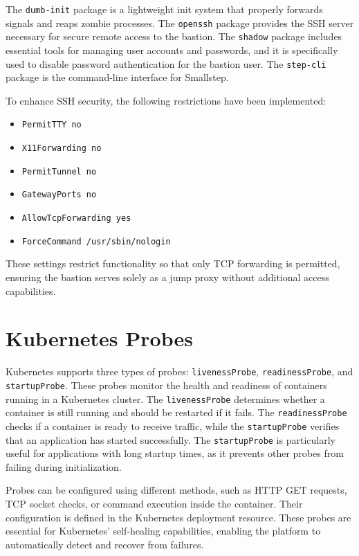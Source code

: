 The \texttt{dumb-init} package is a lightweight init system that properly forwards signals and reaps zombie processes. The \texttt{openssh} package provides the SSH server necessary for secure remote access to the bastion. The \texttt{shadow} package includes essential tools for managing user accounts and passwords, and it is specifically used to disable password authentication for the bastion user. The \texttt{step-cli} package is the command-line interface for Smallstep.

To enhance SSH security, the following restrictions have been implemented:

\begin{multicols}{2} 
    \begin{itemize}
        \item \texttt{PermitTTY no}
        \item \texttt{X11Forwarding no}
        \item \texttt{PermitTunnel no}
        \item \texttt{GatewayPorts no}
        \item \texttt{AllowTcpForwarding yes}
        \item \texttt{ForceCommand /usr/sbin/\allowbreak nologin}
    \end{itemize}
\end{multicols}

These settings restrict functionality so that only TCP forwarding is permitted, ensuring the bastion serves solely as a jump proxy without additional access capabilities.

\section{Kubernetes Probes}
Kubernetes supports three types of probes: \texttt{livenessProbe}, \texttt{readinessProbe}, and \texttt{startupProbe}. These probes monitor the health and readiness of containers running in a Kubernetes cluster. The \texttt{livenessProbe} determines whether a container is still running and should be restarted if it fails. The \texttt{readinessProbe} checks if a container is ready to receive traffic, while the \texttt{startupProbe} verifies that an application has started successfully. The \texttt{startupProbe} is particularly useful for applications with long startup times, as it prevents other probes from failing during initialization.

Probes can be configured using different methods, such as HTTP GET requests, TCP socket checks, or command execution inside the container. Their configuration is defined in the Kubernetes deployment resource. These probes are essential for Kubernetes' self-healing capabilities, enabling the platform to automatically detect and recover from failures.

